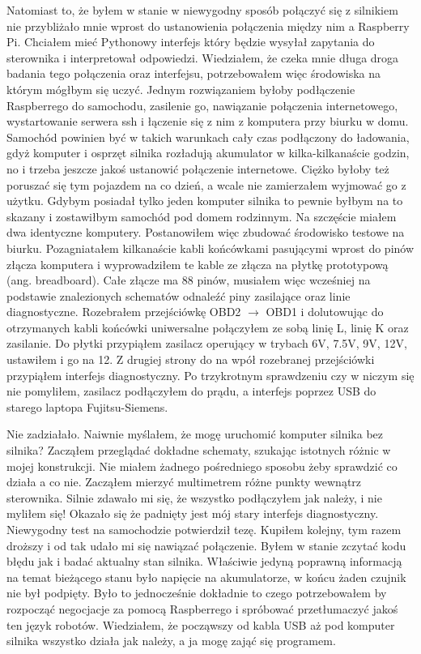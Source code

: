\documentclass[declaration,shortabstract, inz]{iithesis}
\begin{document}
    Natomiast to, że byłem w stanie w niewygodny sposób połączyć się z silnikiem nie przybliżało mnie wprost do ustanowienia połączenia między nim a Raspberry Pi.
    Chciałem mieć Pythonowy interfejs który będzie wysyłał zapytania do sterownika i interpretował odpowiedzi. Wiedziałem, że czeka mnie długa droga badania tego połączenia oraz interfejsu, potrzebowałem więc środowiska na którym mógłbym się uczyć. Jednym rozwiązaniem byłoby podłączenie Raspberrego do samochodu, zasilenie go, nawiązanie połączenia internetowego, wystartowanie serwera ssh i łączenie się z nim z komputera przy biurku w domu. Samochód powinien być w takich warunkach cały czas podłączony do ładowania, gdyż komputer i osprzęt silnika rozładują akumulator w kilka-kilkanaście godzin, no i trzeba jeszcze jakoś ustanowić połączenie internetowe. Ciężko byłoby też poruszać się tym pojazdem na co dzień, a wcale nie zamierzałem wyjmować go z użytku. Gdybym posiadał tylko jeden komputer silnika to pewnie byłbym na to skazany i zostawiłbym samochód pod domem rodzinnym. Na szczęście miałem dwa identyczne komputery. Postanowiłem więc zbudować środowisko testowe na biurku. Pozagniatałem kilkanaście kabli końcówkami pasującymi wprost do pinów złącza komputera i wyprowadziłem te kable ze złącza na płytkę prototypową (ang. breadboard). Całe złącze ma 88 pinów, musiałem więc wcześniej na podstawie znalezionych schematów odnaleźć piny zasilające oraz linie diagnostyczne. Rozebrałem przejściówkę OBD2 $\rightarrow$ OBD1 i dolutowując do otrzymanych kabli końcówki uniwersalne połączyłem ze sobą linię L, linię K oraz zasilanie. Do płytki przypiąłem zasilacz operujący w trybach 6V, 7.5V, 9V, 12V, ustawiłem i go na 12. Z drugiej strony do na wpół rozebranej przejściówki przypiąłem interfejs diagnostyczny. Po trzykrotnym sprawdzeniu czy w niczym się nie pomyliłem, zasilacz podłączyłem do prądu, a interfejs poprzez USB do starego laptopa Fujitsu-Siemens.
    
    Nie zadziałało. Naiwnie myślałem, że mogę uruchomić komputer silnika bez silnika? Zacząłem przeglądać dokładne schematy, szukając istotnych różnic w mojej konstrukcji. Nie miałem żadnego pośredniego sposobu żeby sprawdzić co działa a co nie. Zacząłem mierzyć multimetrem różne punkty wewnątrz sterownika. Silnie zdawało mi się, że wszystko podłączyłem jak należy, i nie myliłem się! Okazało się że padnięty jest mój stary interfejs diagnostyczny. Niewygodny test na samochodzie potwierdził tezę. Kupiłem kolejny, tym razem droższy i od tak udało mi się nawiązać połączenie. Byłem w stanie zczytać kodu błędu jak i badać aktualny stan silnika. Właściwie jedyną poprawną informacją na temat bieżącego stanu było napięcie na akumulatorze, w końcu żaden czujnik nie był podpięty. Było to jednocześnie dokładnie to czego potrzebowałem by rozpocząć negocjacje za pomocą Raspberrego i spróbować przetłumaczyć jakoś ten język robotów. Wiedziałem, że począwszy od kabla USB aż pod komputer silnika wszystko działa jak należy, a ja mogę zająć się programem.
\end{document}
